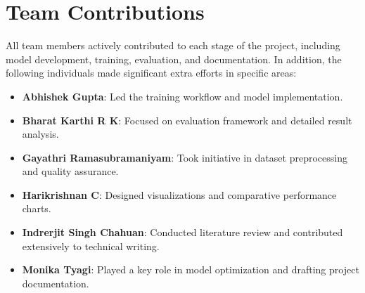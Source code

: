 \documentclass{ecai}
\begin{document}
\newpage
\section*{Team Contributions}
All team members actively contributed to each stage of the project, including model development, training, evaluation, and documentation. In addition, the following individuals made significant extra efforts in specific areas:

\begin{itemize}
    \item \textbf{Abhishek Gupta}: Led the training workflow and model implementation.
    \item \textbf{Bharat Karthi R K}: Focused on evaluation framework and detailed result analysis.
    \item \textbf{Gayathri Ramasubramaniyam}: Took initiative in dataset preprocessing and quality assurance.
    \item \textbf{Harikrishnan C}: Designed visualizations and comparative performance charts.
    \item \textbf{Indrerjit Singh Chahuan}: Conducted literature review and contributed extensively to technical writing.
    \item \textbf{Monika Tyagi}: Played a key role in model optimization and drafting project documentation.
\end{itemize}
\end{document}

